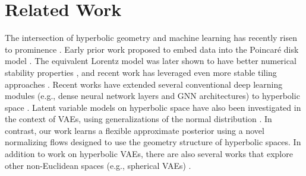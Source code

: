 \section{Related Work}
The intersection of hyperbolic geometry and machine learning has recently risen to prominence \cite{dhingra2018embedding,tay2018hyperbolic,law2019lorentzian,khrulkov2019hyperbolic,ovinnikov2019poincar}. Early prior work proposed to embed data into the Poincar\'e disk model \cite{nickel2017poincare,chamberlain2017neural}.
The equivalent Lorentz model was later shown to have better numerical stability properties \cite{nickel2018learning}, and recent work has leveraged even more stable tiling approaches \cite{yu2019numerically}. 
Recent works have extended several conventional deep learning modules (e.g., dense neural network layers and GNN architectures) to hyperbolic space \cite{gulcehre2018hyperbolic,ganea2018hyperbolic,liu2019graph,chami2019hyperbolic}.
Latent variable models on hyperbolic space have also been investigated in the context of VAEs, using  generalizations of the normal distribution \cite{nagano2019wrapped,mathieu2019continuous}. In contrast, our work learns a flexible approximate posterior using a novel normalizing flows designed to use the geometry structure of hyperbolic spaces.
In addition to work on hyperbolic VAEs, there are also several works that explore other non-Euclidean spaces (e.g., spherical VAEs) \cite{davidson2018hyperspherical,falorsi2019reparameterizing,grattarola2019adversarial}.


